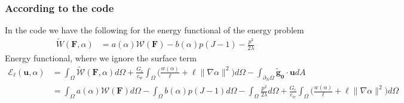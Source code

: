 \documentclass[12pt,3p]{article}
\numberwithin{equation}{section}
\begin{document}
\subsubsection{According to the code}
In the code we have the following for the energy functional of the energy problem 
\begin{align*}
\widetilde{W} (\mathbf{F}, \alpha) &= a(\alpha) \mathcal{W} (\mathbf{F}) - b(\alpha) p (J-1) - \frac{p^2}{2 \lambda} 
\end{align*}
Energy functional, where we ignore the surface term 
\begin{align*}
\mathcal{E}_{\ell}(\boldsymbol{u}, \alpha) &= \int_{\Omega} \widetilde{\mathcal{W}}(\mathbf{F},\alpha)  d \Omega + \frac{G_{c}}{c_{w}} \int_{\Omega} \bigg(\frac{w(\alpha)}{\ell}+\ell\|\nabla \alpha\|^{2} \bigg) d \Omega - \int_{\partial_N \Omega} \mathbf{\tilde{g}_0} \cdot \mathbf{u} d A \\
	&= \int_{\Omega} a(\alpha) \mathcal{W} (\mathbf{F}) d \Omega - \int_{\Omega} b(\alpha) p (J-1) d \Omega - \int_{\Omega} \frac{p^2}{2 \lambda} d \Omega + \frac{G_{c}}{c_{w}} \int_{\Omega} \bigg(\frac{w(\alpha)}{\ell}+\ell\|\nabla \alpha\|^{2} \bigg) d \Omega 
\end{align*}

\end{document}

